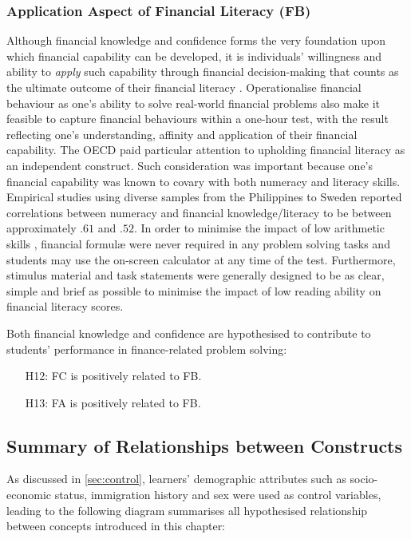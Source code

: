 \subsubsection{Application Aspect of Financial Literacy (FB)}

Although financial knowledge and confidence forms the very foundation upon which financial capability can be developed, it is individuals' willingness and ability to \emph{apply} such capability through financial decision-making that counts as the ultimate outcome of their financial literacy \citep{huston:2010}. Operationalise financial behaviour as one's ability to solve real-world financial problems also make it feasible to capture financial behaviours within a one-hour test, with the result reflecting one's understanding, affinity and application of their financial capability. The OECD paid particular attention to upholding financial literacy as an independent construct. Such consideration was important because one's financial capability was known to covary with both numeracy \citep{geiger:2020, ozkale:2020a, ozkale:2020b, sole:2014} and literacy \citep{bay:2014} skills. Empirical studies using diverse samples from the Philippines \citep{indefenso:2020} to Sweden \citep{skagerlund:2018} reported correlations between numeracy and financial knowledge/literacy to be between approximately $.61$ and $.52$. In order to minimise the impact of low arithmetic skills \citep{huston:2010}, financial formul{\ae} were never required in any problem solving tasks and students may use the on-screen calculator at any time of the test. Furthermore, stimulus material and task statements were generally designed to be as clear, simple and brief as possible to minimise the impact of low reading ability on financial literacy scores.

Both financial knowledge and confidence are hypothesised to contribute to students' performance in finance-related problem solving:
\begin{itemize}
    \item[H12:] FC is positively related to FB.
    \item[H13:] FA is positively related to FB.
\end{itemize}

\subsection{Summary of Relationships between Constructs}

As discussed in \cref{sec:control}, learners' demographic attributes such as socio-economic status, immigration history and sex were used as control variables, leading to the following diagram summarises all hypothesised relationship between concepts introduced in this chapter:

%